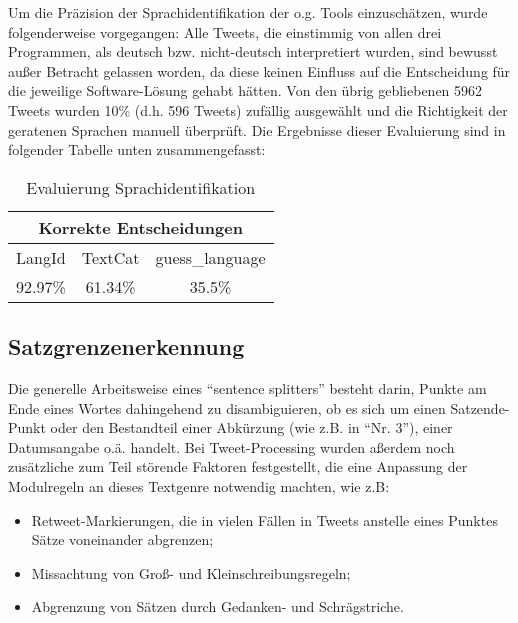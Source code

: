 \documentclass[11pt]{article}
\begin{document}
Um die Präzision der Sprachidentifikation der o.g. Tools einzuschätzen, wurde folgenderweise vorgegangen: Alle
Tweets, die einstimmig von allen drei Programmen, als deutsch bzw. nicht-deutsch
interpretiert wurden, sind bewusst außer Betracht gelassen worden, da diese keinen Einfluss auf 
die Entscheidung für die jeweilige Software-Lösung gehabt hätten. Von den übrig
gebliebenen 5962 Tweets wurden 10\%{} (d.h. 596 Tweets) zufällig ausgewählt und die Richtigkeit der
geratenen Sprachen manuell überprüft. Die Ergebnisse dieser
Evaluierung sind in folgender Tabelle unten zusammengefasst: \newline


\begin{table}[h]
\begin{center}
\begin{tabular}{|c|c|c|}
\hline
\multicolumn{3}{|c|}{Korrekte Entscheidungen}\\\hline\hline
LangId & TextCat & guess\_language \\\hline
92.97\% & 61.34\% & 35.5\% \\\hline
\end{tabular}
\caption{Evaluierung Sprachidentifikation}
\end{center}
\end{table}



\subsection{Satzgrenzenerkennung}

Die generelle Arbeitsweise eines ``sentence splitters'' besteht darin,
Punkte am Ende eines Wortes dahingehend zu disambiguieren, ob es sich
um einen Satzende-Punkt oder den Bestandteil einer Abkürzung (wie
z.B. in ``Nr. 3''), einer Datumsangabe o.ä. handelt. Bei
Tweet-Processing wurden aßerdem noch zusätzliche zum Teil störende
Faktoren festgestellt, die eine Anpassung der Modulregeln an dieses
Textgenre notwendig machten, wie z.B:
\begin{itemize}
  \item Retweet-Markierungen, die in vielen Fällen in Tweets anstelle eines
    Punktes Sätze voneinander abgrenzen;
  \item Missachtung von Groß- und Kleinschreibungsregeln;
  \item Abgrenzung von Sätzen durch Gedanken- und Schrägstriche.
\end{itemize}
\end{document}
